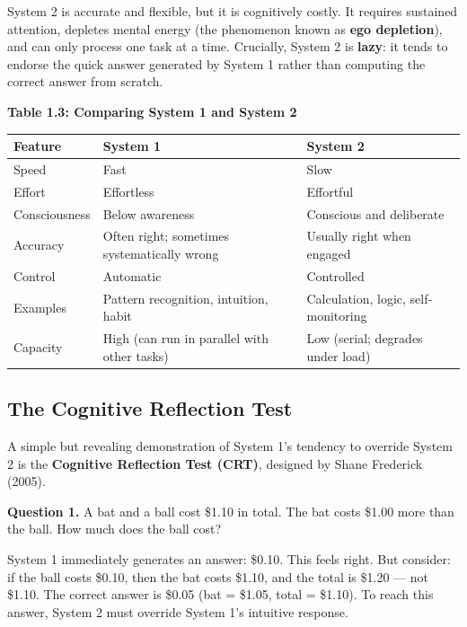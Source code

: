 \documentclass[12pt, letterpaper]{article}
\begin{document}
System 2 is accurate and flexible, but it is cognitively costly. It requires sustained attention, depletes mental energy (the phenomenon known as \textbf{ego depletion}), and can only process one task at a time. Crucially, System 2 is \textbf{lazy}: it tends to endorse the quick answer generated by System 1 rather than computing the correct answer from scratch.

\textbf{Table 1.3: Comparing System 1 and System 2}


\begin{table}[H]
\centering
\small
\begin{tabularx}{\linewidth}{lYY}
\toprule
Feature & System 1 & System 2 \\
\midrule
Speed & Fast & Slow \\
Effort & Effortless & Effortful \\
Consciousness & Below awareness & Conscious and deliberate \\
Accuracy & Often right; sometimes systematically wrong & Usually right when engaged \\
Control & Automatic & Controlled \\
Examples & Pattern recognition, intuition, habit & Calculation, logic, self-monitoring \\
Capacity & High (can run in parallel with other tasks) & Low (serial; degrades under load) \\
\bottomrule
\end{tabularx}
\end{table}


\medskip


\subsection{The Cognitive Reflection Test}


A simple but revealing demonstration of System 1's tendency to override System 2 is the \textbf{Cognitive Reflection Test (CRT)}, designed by Shane Frederick (2005).

\textbf{Question 1.} A bat and a ball cost \$1.10 in total. The bat costs \$1.00 more than the ball. How much does the ball cost?

System 1 immediately generates an answer: \$0.10. This feels right. But consider: if the ball costs \$0.10, then the bat costs \$1.10, and the total is \$1.20 --- not \$1.10. The correct answer is \$0.05 (bat = \$1.05, total = \$1.10). To reach this answer, System 2 must override System 1's intuitive response.
\end{document}
